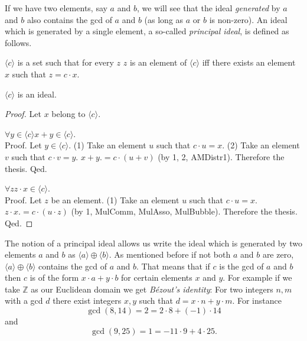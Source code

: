 \documentclass{article}
\newcommand{\Int}{\mathbb{Z}}
\begin{document}
  If we have two elements, say $a$ and $b$, we will see that the ideal
  \textit{generated} by $a$ and $b$ also contains the gcd of $a$ and $b$ (as
  long as $a$ or $b$ is non-zero). An ideal which is generated by a single
  element, a so-called \textit{principal ideal}, is defined as follows.

  \begin{forthel}
    \begin{definition}[id=DefPrIdeal]
      $\langle c \rangle$ is a set such that for every $z$ $z$ is an element of
      $\langle c \rangle$ iff there exists an element $x$ such that
      $z = c \cdot x$.
    \end{definition}

    \begin{lemma}[id=PrIdeal]
      $\langle c \rangle$ is an ideal.
    \end{lemma}
    \begin{proof}
      Let $x$ belong to $\langle c \rangle$.

      $\forall y \in \langle c \rangle x + y \in \langle c \rangle$. \\
      Proof.
        Let $y \in \langle c \rangle$.
        (1) Take an element $u$ such that $c \cdot u = x$.
        (2) Take an element $v$ such that $c \cdot v = y$.
        $x + y .= c \cdot (u + v)$ (by 1, 2, AMDistr1).
        Therefore the thesis.
      Qed.

      $\forall z z \cdot x \in \langle c \rangle$. \\
      Proof.
        Let $z$ be an element.
        (1) Take an element $u$ such that $c \cdot u = x$.
        $z \cdot x .= c \cdot (u \cdot z)$ (by 1, MulComm, MulAsso, MulBubble).
        Therefore the thesis.
      Qed.
    \end{proof}
  \end{forthel}

  The notion of a principal ideal allows us write the ideal which is generated
  by two elements $a$ and $b$ as $\langle a \rangle \oplus \langle b \rangle$.
  As mentioned before if not both $a$ and $b$ are zero,
  $\langle a \rangle \oplus \langle b \rangle$ contains the gcd of $a$ and $b$.
  That means that if $c$ is the gcd of $a$ and $b$ then $c$ is of the form
  $x \cdot a + y \cdot b$ for certain elements $x$ and $y$. For example if we
  take $\Int$ as our Euclidean domain we get \textit{Bézout's identity}: For two
  integers $n,m$ with a gcd $d$ there exist integers $x,y$ such that
  $d = x \cdot n + y \cdot m$. For instance
  \[ \gcd(8,14) = 2 = 2 \cdot 8 + (-1) \cdot 14 \]
  and
  \[ \gcd(9,25) = 1 = -11 \cdot 9 + 4 \cdot 25. \]
\end{document}
